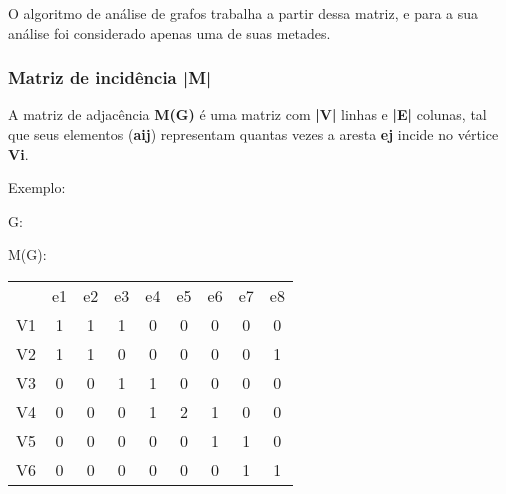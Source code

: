 \documentclass[a4paper, 12pt]{article}
\begin{document}
    \indent O algoritmo de análise de grafos trabalha a partir dessa matriz, e para a sua análise foi considerado apenas uma de suas metades.
    
\subsubsection{Matriz de incidência |M|}

    A matriz de adjacência \textbf{M(G)} é uma matriz com \textbf{|V|} linhas e \textbf{|E|} colunas, tal que seus elementos (\textbf{aij}) representam quantas vezes a aresta \textbf{ej} incide no vértice \textbf{Vi}.
    
    \vspace{0.5in}
    
    Exemplo:
    
    \begin{multicols}{2}
        \begin{center}
        G:
        \end{center}
        
        \begin{center}
        M(G):
        \end{center}
        \begin{tabular}{ccccccccc}
            & e1 & e2 & e3 & e4 & e5 & e6 & e7 & e8 \\
            V1 & 1  & 1  & 1  & 0  & 0  & 0  & 0  & 0  \\
            V2 & 1  & 1  & 0  & 0  & 0  & 0  & 0  & 1  \\
            V3 & 0  & 0  & 1  & 1  & 0  & 0  & 0  & 0  \\
            V4 & 0  & 0  & 0  & 1  & 2  & 1  & 0  & 0  \\
            V5 & 0  & 0  & 0  & 0  & 0  & 1  & 1  & 0  \\
            V6 & 0  & 0  & 0  & 0  & 0  & 0  & 1  & 1 
        \end{tabular}
    \end{multicols}
    
\end{document}
